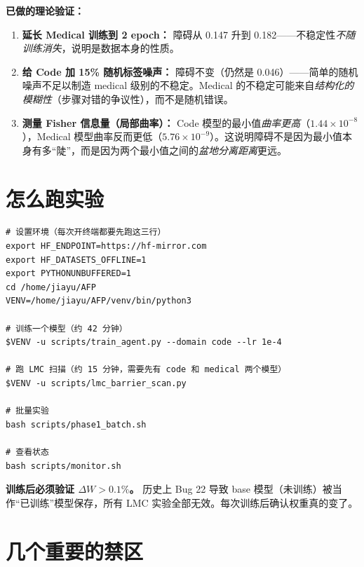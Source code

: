 \documentclass[12pt,a4paper]{ctexart}
\begin{document}
\textbf{已做的理论验证：}
\begin{enumerate}
  \item \textbf{延长 Medical 训练到 2 epoch：} 障碍从 0.147 升到 0.182——不稳定性\emph{不随训练消失}，说明是数据本身的性质。
  \item \textbf{给 Code 加 15\% 随机标签噪声：} 障碍不变（仍然是 0.046）——简单的随机噪声不足以制造 medical 级别的不稳定。Medical 的不稳定可能来自\emph{结构化的模糊性}（步骤对错的争议性），而不是随机错误。
  \item \textbf{测量 Fisher 信息量（局部曲率）：} Code 模型的最小值\emph{曲率更高}（$1.44\times10^{-8}$），Medical 模型曲率反而更低（$5.76\times10^{-9}$）。这说明障碍不是因为最小值本身有多``陡''，而是因为两个最小值之间的\emph{盆地分离距离}更远。
\end{enumerate}

\section{怎么跑实验}

\begin{verbatim}
# 设置环境（每次开终端都要先跑这三行）
export HF_ENDPOINT=https://hf-mirror.com
export HF_DATASETS_OFFLINE=1
export PYTHONUNBUFFERED=1
cd /home/jiayu/AFP
VENV=/home/jiayu/AFP/venv/bin/python3

# 训练一个模型（约 42 分钟）
$VENV -u scripts/train_agent.py --domain code --lr 1e-4

# 跑 LMC 扫描（约 15 分钟，需要先有 code 和 medical 两个模型）
$VENV -u scripts/lmc_barrier_scan.py

# 批量实验
bash scripts/phase1_batch.sh

# 查看状态
bash scripts/monitor.sh
\end{verbatim}

\begin{warnbox}
\textbf{训练后必须验证 $\Delta W > 0.1\%$。} 历史上 Bug 22 导致 base 模型（未训练）被当作``已训练''模型保存，所有 LMC 实验全部无效。每次训练后确认权重真的变了。
\end{warnbox}

\section{几个重要的禁区}
\end{document}
